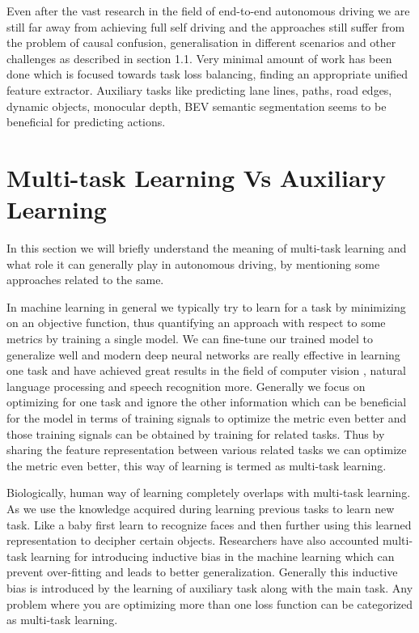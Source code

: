 Even after the vast research in the field of end-to-end autonomous driving we are still far away from achieving full self driving and the approaches still suffer from the problem of causal confusion, generalisation in different scenarios and other challenges as described in section 1.1. Very minimal amount of work has been done which is focused towards task loss balancing, finding an appropriate unified feature extractor. Auxiliary tasks like predicting lane lines, paths, road edges, dynamic objects, monocular depth, BEV semantic segmentation seems to be beneficial for predicting actions.

    \section{Multi-task Learning Vs Auxiliary Learning}
    
    In this section we will briefly understand the meaning of multi-task learning and what role it can generally play in autonomous driving, by mentioning some approaches related to the same. 
    
    In machine learning in general we typically try to learn for a task by minimizing on an objective function, thus quantifying an approach with respect to some metrics by training a single model. We can fine-tune our trained model to generalize well and modern deep neural networks are really effective in learning one task and have achieved great results in the field of computer vision \cite{DBLP:journals/corr/KaiserGSVPJU17} \cite{DBLP:journals/corr/abs-1904-08492}, natural language processing \cite{DBLP:journals/corr/KaiserGSVPJU17} and speech recognition \cite{DBLP:journals/corr/ToshniwalTLL17} more. Generally we focus on optimizing for one task and ignore the other information which can be beneficial for the model in terms of training signals to optimize the metric even better and those training signals can be obtained by training for related tasks. Thus by sharing the feature representation between various related tasks we can optimize the metric even better, this way of learning is termed as multi-task learning. 
    
    Biologically, human way of learning completely overlaps with multi-task learning. As we use the knowledge acquired during learning previous tasks to learn new task. Like a baby first learn to recognize faces and then further using this learned representation to decipher certain objects. Researchers have also accounted multi-task learning for introducing inductive bias in the machine learning which can prevent over-fitting and leads to better generalization. Generally this inductive bias is introduced by the learning of auxiliary task along with the main task. Any problem where you are optimizing more than one loss function can be categorized as multi-task learning. 
    

